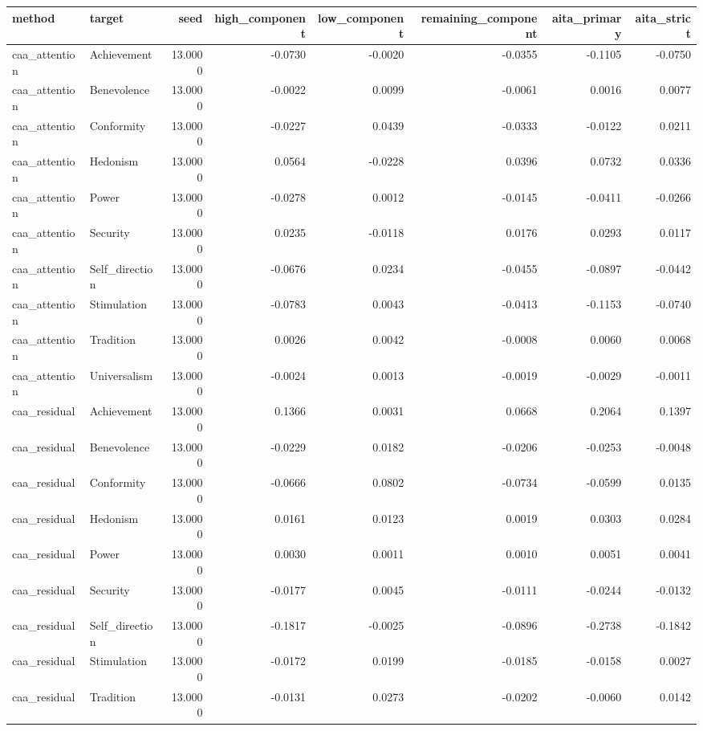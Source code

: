 \begin{tabular}{llrrrrrr}
\toprule
method & target & seed & high\_component & low\_component & remaining\_component & aita\_primary & aita\_strict \\
\midrule
caa\_attention & Achievement & 13.0000 & -0.0730 & -0.0020 & -0.0355 & -0.1105 & -0.0750 \\
caa\_attention & Benevolence & 13.0000 & -0.0022 & 0.0099 & -0.0061 & 0.0016 & 0.0077 \\
caa\_attention & Conformity & 13.0000 & -0.0227 & 0.0439 & -0.0333 & -0.0122 & 0.0211 \\
caa\_attention & Hedonism & 13.0000 & 0.0564 & -0.0228 & 0.0396 & 0.0732 & 0.0336 \\
caa\_attention & Power & 13.0000 & -0.0278 & 0.0012 & -0.0145 & -0.0411 & -0.0266 \\
caa\_attention & Security & 13.0000 & 0.0235 & -0.0118 & 0.0176 & 0.0293 & 0.0117 \\
caa\_attention & Self\_direction & 13.0000 & -0.0676 & 0.0234 & -0.0455 & -0.0897 & -0.0442 \\
caa\_attention & Stimulation & 13.0000 & -0.0783 & 0.0043 & -0.0413 & -0.1153 & -0.0740 \\
caa\_attention & Tradition & 13.0000 & 0.0026 & 0.0042 & -0.0008 & 0.0060 & 0.0068 \\
caa\_attention & Universalism & 13.0000 & -0.0024 & 0.0013 & -0.0019 & -0.0029 & -0.0011 \\
caa\_residual & Achievement & 13.0000 & 0.1366 & 0.0031 & 0.0668 & 0.2064 & 0.1397 \\
caa\_residual & Benevolence & 13.0000 & -0.0229 & 0.0182 & -0.0206 & -0.0253 & -0.0048 \\
caa\_residual & Conformity & 13.0000 & -0.0666 & 0.0802 & -0.0734 & -0.0599 & 0.0135 \\
caa\_residual & Hedonism & 13.0000 & 0.0161 & 0.0123 & 0.0019 & 0.0303 & 0.0284 \\
caa\_residual & Power & 13.0000 & 0.0030 & 0.0011 & 0.0010 & 0.0051 & 0.0041 \\
caa\_residual & Security & 13.0000 & -0.0177 & 0.0045 & -0.0111 & -0.0244 & -0.0132 \\
caa\_residual & Self\_direction & 13.0000 & -0.1817 & -0.0025 & -0.0896 & -0.2738 & -0.1842 \\
caa\_residual & Stimulation & 13.0000 & -0.0172 & 0.0199 & -0.0185 & -0.0158 & 0.0027 \\
caa\_residual & Tradition & 13.0000 & -0.0131 & 0.0273 & -0.0202 & -0.0060 & 0.0142 \\

\end{tabular}
